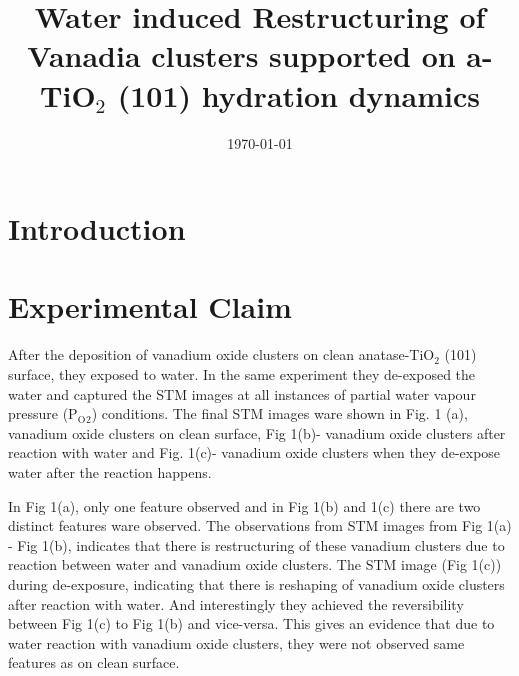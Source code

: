 \documentclass[aip,amsmath,amssymb,reprint, jcp]{revtex4-1}
\begin{document}
\title[]{Water induced Restructuring of Vanadia clusters supported on a-TiO$_2$ (101) hydration dynamics}
 
\date{\today}%

\begin{abstract}

\end{abstract}
\maketitle

\section{\label{sec:introduction}Introduction}
\section{Experimental Claim}
After the deposition of vanadium oxide clusters on clean anatase-TiO$_2$ (101) surface, they exposed to water. In the same experiment they de-exposed the water and captured the STM images at all instances of partial water vapour pressure 
(P${_\text{O}{_2}}$) conditions. The final STM images ware shown in Fig. 1 (a), vanadium oxide clusters on clean surface, Fig 1(b)- vanadium oxide clusters after reaction with water and Fig. 1(c)- vanadium oxide clusters when they de-expose  water after the reaction happens.   

In Fig 1(a), only one feature observed and in Fig 1(b) and 1(c) there are two distinct features ware observed. The observations  from STM images from Fig 1(a) - Fig 1(b), indicates that there is restructuring of these vanadium clusters due to reaction between water and vanadium oxide clusters. The STM image (Fig 1(c)) during de-exposure,  indicating that there is reshaping of vanadium oxide clusters after reaction with water. And interestingly they achieved the reversibility between Fig 1(c) to Fig 1(b) and vice-versa. This gives an evidence that due to water reaction with vanadium oxide clusters, they were not observed same features as on clean surface.         
\end{document}

